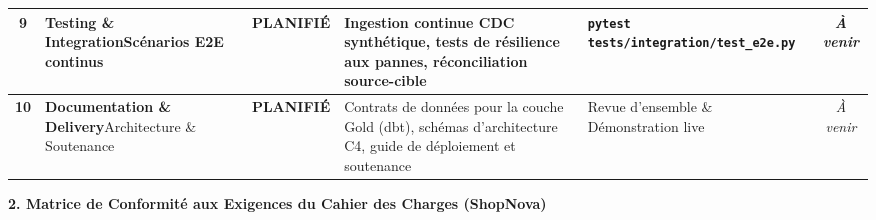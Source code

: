 \documentclass[9pt,a4paper,landscape]{article}
\begin{document}
\begin{tabularx}{\textwidth}{c p{3.2cm} c p{8.6cm} p{5.6cm} c}
\midrule
\textbf{9} & \textbf{Testing \& Integration}\newline Scénarios E2E continus & \cellcolor{futurebg}\color{futuretext}\textbf{PLANIFIÉ} & Ingestion continue CDC synthétique, tests de résilience aux pannes, réconciliation source-cible & \texttt{pytest tests/integration/test\_e2e.py} & \textit{À venir} \\
\midrule
\textbf{10} & \textbf{Documentation \& Delivery}\newline Architecture \& Soutenance & \cellcolor{futurebg}\color{futuretext}\textbf{PLANIFIÉ} & Contrats de données pour la couche Gold (dbt), schémas d'architecture C4, guide de déploiement et soutenance & Revue d'ensemble \& Démonstration live & \textit{À venir} \\
\bottomrule
\end{tabularx}

\newpage

\noindent
\textbf{\normalsize \color{primary}2. Matrice de Conformité aux Exigences du Cahier des Charges (ShopNova)}

\vspace{0.12cm}
\end{document}
